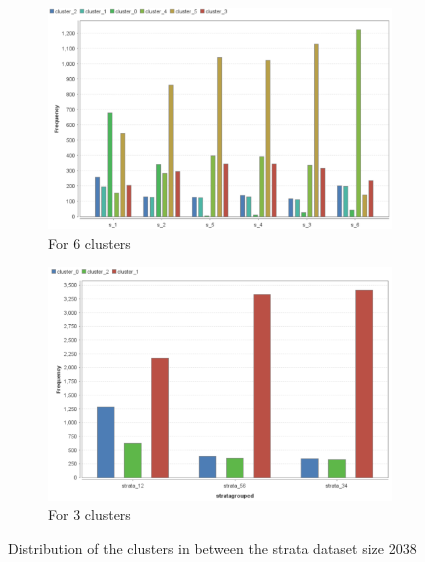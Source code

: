\begin{figure}[!htbp]
\vspace{-3em}
\centering
\begin{subfigure}{0.45\textwidth}
\includegraphics[width=\linewidth]{ClusterOrigRapidDistribution2038eq.PNG}
\caption{For 6 clusters}
\label{fig:2038_6}
\end{subfigure}
\begin{subfigure}{0.45\textwidth}
\includegraphics[width=\linewidth]{ClusterOrigRapidDistribution2038eq2.PNG}
\caption{For 3 clusters}
\label{fig:2038_3}
\end{subfigure}
\caption{Distribution of the clusters in between the strata dataset size 2038}
\label{fig:2038_Clust}
\vspace{-3em}
\end{figure}
\vspace{-3em}
